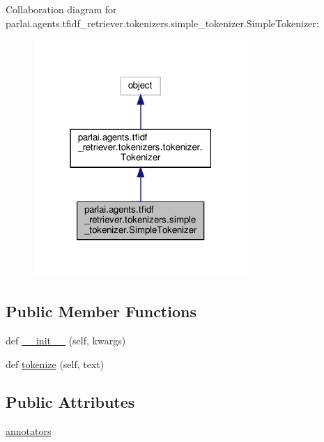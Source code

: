 Collaboration diagram for parlai.\+agents.\+tfidf\+\_\+retriever.\+tokenizers.\+simple\+\_\+tokenizer.\+Simple\+Tokenizer\+:
\nopagebreak
\begin{figure}[H]
\begin{center}
\leavevmode
\includegraphics[width=231pt]{dc/d4d/classparlai_1_1agents_1_1tfidf__retriever_1_1tokenizers_1_1simple__tokenizer_1_1SimpleTokenizer__coll__graph}
\end{center}
\end{figure}
\subsection*{Public Member Functions}
\begin{DoxyCompactItemize}
\item 
def \hyperlink{classparlai_1_1agents_1_1tfidf__retriever_1_1tokenizers_1_1simple__tokenizer_1_1SimpleTokenizer_a6a038fd66269e0a8e76e62260b13f4d9}{\+\_\+\+\_\+init\+\_\+\+\_\+} (self, kwargs)
\item 
def \hyperlink{classparlai_1_1agents_1_1tfidf__retriever_1_1tokenizers_1_1simple__tokenizer_1_1SimpleTokenizer_a690bc237be6349de5c3f105e0be37ea7}{tokenize} (self, text)
\end{DoxyCompactItemize}
\subsection*{Public Attributes}
\begin{DoxyCompactItemize}
\item 
\hyperlink{classparlai_1_1agents_1_1tfidf__retriever_1_1tokenizers_1_1simple__tokenizer_1_1SimpleTokenizer_aa2edbea9c08e8b1fbe5eef7d61e3f432}{annotators}
\end{DoxyCompactItemize}
